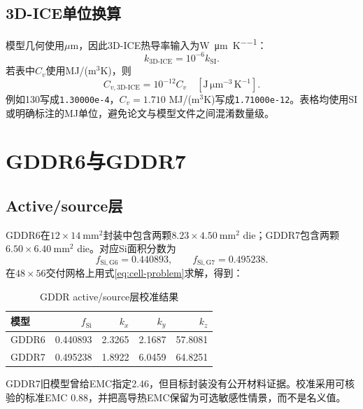 \documentclass[UTF8,zihao=-4]{ctexart}
\begin{document}
\subsection{3D-ICE单位换算}

模型几何使用$\mu\mathrm{m}$，因此3D-ICE热导率输入为\si{\watt\per\micro\metre\per\kelvin}：
\begin{equation}
  k_{\mathrm{3D\mbox{-}ICE}}=10^{-6}k_{\mathrm{SI}}.
  \label{eq:unit-conversion}
\end{equation}
若表中$C_v$使用MJ/(m$^3$K)，则
\begin{equation}
  C_{v,\mathrm{3D\mbox{-}ICE}}=10^{-12}C_v
  \quad [\mathrm{J\,\mu m^{-3}\,K^{-1}}].
  \label{eq:cv-unit-conversion}
\end{equation}
例如\SI{130}{\tcond}写成\texttt{1.30000e-4}，$C_v=1.710$ MJ/(m$^3$K)写成\texttt{1.71000e-12}。表格均使用SI或明确标注的MJ单位，避免论文与模型文件之间混淆数量级。

\section{GDDR6与GDDR7}

\subsection{Active/source层}

GDDR6在$12\times14~\mathrm{mm^2}$封装中包含两颗$8.23\times4.50~\mathrm{mm^2}$ die；GDDR7包含两颗$6.50\times6.40~\mathrm{mm^2}$ die。对应Si面积分数为
\begin{equation}
  f_{\mathrm{Si,G6}}=0.440893,\qquad
  f_{\mathrm{Si,G7}}=0.495238.
\end{equation}
在$48\times56$交付网格上用式\eqref{eq:cell-problem}求解，得到：

\begin{table}[htbp]
\centering
\caption{GDDR active/source层校准结果}
\begin{tabular}{lrrrr}
\toprule
模型 & $f_{\mathrm{Si}}$ & $k_x$ & $k_y$ & $k_z$ \\
\midrule
GDDR6 & 0.440893 & 2.3265 & 2.1687 & 57.8081 \\
GDDR7 & 0.495238 & 1.8922 & 6.0459 & 64.8251 \\
\bottomrule
\end{tabular}
\end{table}

GDDR7旧模型曾给EMC指定\SI{2.46}{\tcond}，但目标封装没有公开材料证据。校准采用可核验的标准EMC \SI{0.88}{\tcond}\cite{KimYooPatent2026}，并把高导热EMC保留为可选敏感性情景，而不是名义值。
\end{document}
